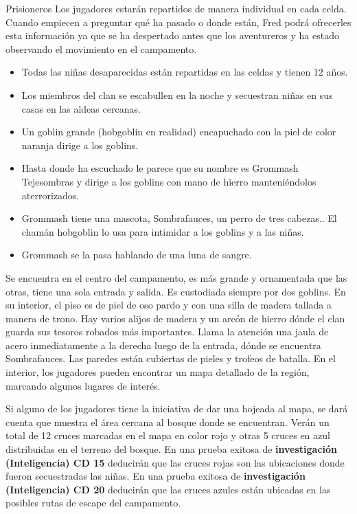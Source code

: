 \documentclass[10pt,twoside,twocolumn,openany]{dndbook}
\begin{document}
\begin{DndComment}{Prisioneros}
Los jugadores estarán repartidos de manera individual en cada celda. Cuando empiecen a preguntar 
qué ha pasado o donde están, Fred podrá ofrecerles esta información ya que se ha despertado 
antes que los aventureros y ha estado observando el movimiento en el campamento.

  \begin{itemize}
    \item Todas las niñas desaparecidas están repartidas en las celdas y tienen 12 años.
    \item Los miembros del clan se escabullen en la noche y secuestran niñas en sus casas en las 
    aldeas cercanas.
    \item Un goblin grande (hobgoblin en realidad) encapuchado con la piel de color naranja 
    dirige a los goblins. 
    \item Hasta donde ha escuchado le parece que su nombre es Grommash Tejesombras y 
    dirige a los goblins con mano de hierro manteniéndolos aterrorizados.
    \item Grommash tiene una mascota, Sombrafauces, un perro de tres cabezas.. El chamán 
    hobgoblin lo usa para intimidar a los goblins y a las niñas.
    \item Grommash se la pasa hablando de una luna de sangre.
  \end{itemize}

\end{DndComment}

Se encuentra en el centro del campamento, es más grande y ornamentada que las otras, tiene una sola 
entrada y salida. Es custodiada siempre por dos goblins. En su interior, el piso es de piel de oso pardo 
y con una silla de madera tallada a manera de trono. Hay varios alijos de madera y un arcón de hierro 
dónde el clan guarda sus tesoros robados más importantes. Llama la atención una jaula de acero 
inmediatamente a la derecha luego de la entrada, dónde se encuentra Sombrafauces. Las paredes están 
cubiertas de pieles y trofeos de batalla. En el interior, los jugadores pueden encontrar un mapa 
detallado de la región, marcando algunos lugares de interés.

Si alguno de los jugadores tiene la iniciativa de dar una hojeada al mapa, se dará cuenta que 
muestra el área cercana al bosque donde se encuentran. Verán un total de 12 cruces marcadas en el 
mapa en color rojo y otras 5 cruces en azul distribuidas en el terreno del bosque. En una prueba 
exitosa de \textbf{investigación (Inteligencia) CD 15} deducirán que las cruces rojas son las 
ubicaciones donde fueron secuestradas las niñas. En una prueba exitosa de 
\textbf{investigación (Inteligencia) CD 20} deducirán que las cruces azules están ubicadas en 
las posibles rutas de escape del campamento. 
\end{document}
